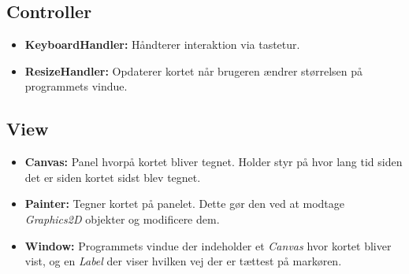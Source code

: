 \subsection{Controller}

\begin{itemize}
	\item \textbf{KeyboardHandler:} Håndterer interaktion via tastetur.
	\item \textbf{ResizeHandler:} Opdaterer kortet når brugeren ændrer størrelsen på programmets vindue.
\end{itemize}

\subsection{View}

\begin{itemize}
	\item \textbf{Canvas:} Panel hvorpå kortet bliver tegnet. Holder styr på hvor lang tid siden det er siden kortet sidst blev tegnet.
	\item \textbf{Painter:} Tegner kortet på panelet. Dette gør den ved at modtage \emph{Graphics2D} objekter og modificere dem.
	\item \textbf{Window:} Programmets vindue der indeholder et \emph{Canvas} hvor kortet bliver vist, og en \emph{Label} der viser hvilken vej der er tættest på markøren.
\end{itemize}